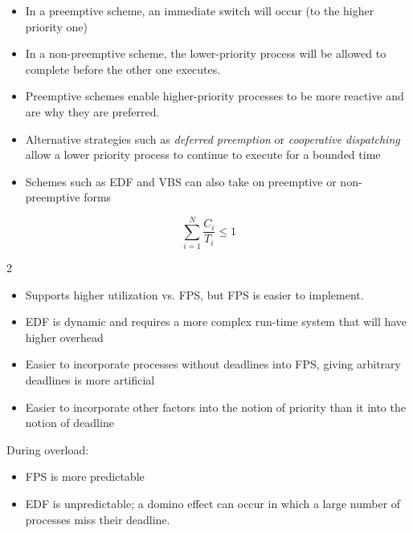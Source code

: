 \documentclass[a4paper,11pt]{article}
\begin{document}
\begin{itemize}
\item In a preemptive scheme, an immediate switch will occur (to the higher priority one)
\item In a non-preemptive scheme, the lower-priority process will be allowed to complete before the other one executes.
\item Preemptive schemes enable higher-priority processes to be more reactive and are why they are preferred.
\item Alternative strategies such as \emph{deferred preemption} or \emph{cooperative dispatching} allow a lower priority process to continue to execute for a bounded time
\item Schemes such as EDF and VBS can also take on preemptive or non-preemptive forms
\end{itemize}

\Needspace{100pt}

\[
\sum^N_{i=1} \frac{C_{i}}{T_{i}} \leq 1
\]

\begin{multicols}{2}\begin{itemize}
\item \begin{minipage}[t]{\linewidth}Supports higher utilization vs. FPS, but FPS is easier to implement. \end{minipage}
\item \begin{minipage}[t]{\linewidth}EDF is dynamic and requires a more complex run-time system that will have higher overhead\end{minipage}
\item \begin{minipage}[t]{\linewidth}Easier to incorporate processes without deadlines into FPS, giving arbitrary deadlines is more artificial\end{minipage}
\item \begin{minipage}[t]{\linewidth}Easier to incorporate other factors into the notion of priority than it into the notion of deadline\end{minipage}
\end{itemize}\end{multicols}

\Needspace{100pt}
During overload:\par

\begin{itemize}
\item FPS is more predictable
\item EDF is unpredictable; a domino effect can occur in which a large number of processes miss their deadline.
\end{itemize}
\end{document}
